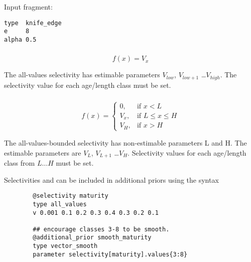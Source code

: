Input fragment: {\small{\begin{verbatim}
type  knife_edge
e     8
alpha 0.5
\end{verbatim}}}

\subsubsection[All-values]{}\label{sec:Selectivity-AllValues}

\begin{equation}
f(x)=V_x
\end{equation}

The all-values selectivity has estimable parameters $V_{low}$, $V_{low+1}$ \ldots $V_{high}$. The selectivity value for each age/length class must be set.

\subsubsection[All-values-bounded]{}\label{sec:Selectivity-AllValuesBounded}

\begin{equation}
f(x)=\begin{cases}
		 0, & \text{if $x < L$} \\
		 V_x, & \text{if $L \le x \le H$} \\
		 V_H, & \text{if $x > H$}
  \end{cases}
\end{equation}

The all-values-bounded selectivity has non-estimable parameters L and H. The estimable parameters are $V_L$, $V_{L+1}$ \ldots $V_H$. Selectivity values for each age/length class from $L \ldots H$ must be set.

Selectivities  and  can be included in additional priors using the syntax

{\small{\begin{verbatim}
		@selectivity maturity
		type all_values
		v 0.001 0.1 0.2 0.3 0.4 0.3 0.2 0.1

		## encourage classes 3-8 to be smooth.
		@additional_prior smooth_maturity
		type vector_smooth
		parameter selectivity[maturity].values{3:8}
		\end{verbatim}}}

\subsubsection[Increasing ]{} \label{sec:Selectivity-Increasing}

